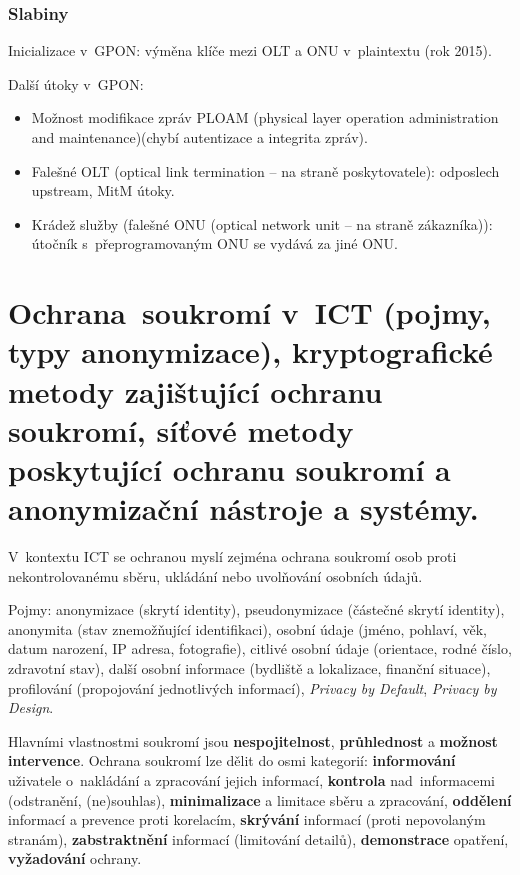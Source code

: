 \subsubsection{Slabiny}

Inicializace v~GPON: výměna klíče mezi OLT a ONU v~plaintextu (rok 2015).

Další útoky v~GPON:
\vspace*{-0.5em}\begin{itemize}
    \item Možnost modifikace zpráv PLOAM (physical layer operation administration and maintenance)(chybí autentizace a integrita zpráv).
    \item Falešné OLT (optical link termination -- na straně poskytovatele): odposlech upstream, MitM útoky.
    \item Krádež služby (falešné ONU (optical network unit -- na straně zákazníka)): útočník s~přeprogramovaným ONU se vydává za jiné ONU.
\end{itemize}

\clearpage
\section{Ochrana~soukromí v~ICT (pojmy, typy anonymizace), kryptografické metody zajištující ochranu soukromí, síťové metody poskytující ochranu soukromí a anonymizační nástroje a systémy.}

V~kontextu ICT se ochranou myslí zejména ochrana soukromí osob proti nekontrolovanému sběru, ukládání nebo uvolňování osobních údajů.

Pojmy: anonymizace (skrytí identity), pseudonymizace (částečné skrytí identity), anonymita (stav znemožňující identifikaci), osobní údaje (jméno, pohlaví, věk, datum narození, IP adresa, fotografie), citlivé osobní údaje (orientace, rodné číslo, zdravotní stav), další osobní informace (bydliště a lokalizace, finanční situace), profilování (propojování jednotlivých informací), \emph{Privacy by Default}, \emph{Privacy by Design}.

Hlavními vlastnostmi soukromí jsou \textbf{nespojitelnost}, \textbf{průhlednost} a \textbf{možnost intervence}.
Ochrana soukromí lze dělit do osmi kategorií:
\textbf{informování} uživatele o~nakládání a zpracování jejich informací, \textbf{kontrola} nad~informacemi (odstranění, (ne)souhlas), \textbf{minimalizace} a limitace sběru a zpracování, \textbf{oddělení} informací a prevence proti korelacím, \textbf{skrývání} informací (proti nepovolaným stranám), \textbf{zabstraktnění} informací (limitování detailů), \textbf{demonstrace} opatření, \textbf{vyžadování} ochrany.

